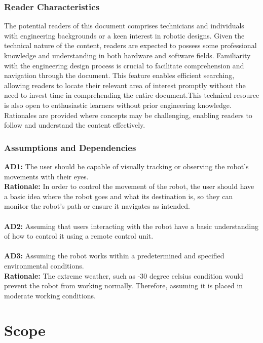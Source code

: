 \documentclass[12pt]{article}
\begin{document}
\subsubsection{Reader Characteristics}
The potential readers of this document comprises technicians and individuals with engineering backgrounds or a keen interest in robotic designs.
Given the technical nature of the content, readers are expected to possess some professional knowledge and understanding in both hardware and software fields. Familiarity with the engineering design process is crucial to facilitate comprehension and navigation through the document. This feature enables efficient searching, allowing readers to locate their relevant area of interest promptly without the need to invest time in comprehending the entire document.This technical resource is also open to enthusiastic learners without prior engineering knowledge. Rationales are provided where concepts may be challenging, enabling readers to follow and understand the content effectively.

\subsubsection{Assumptions and Dependencies}
\label{sec:Assumptions and Dependencies}
\textbf{AD1:} The user should be capable of visually tracking or observing the robot's movements with their eyes. \\
\textbf{Rationale:} In order to control the movement of the robot, the user should have a basic idea where the robot goes and what its destination is, so they can monitor the robot's path or ensure it navigates as intended.\\\\
\textbf{AD2:} Assuming that users interacting with the robot have a basic understanding of how to control it using a remote control unit. \\\\
\textbf{AD3:} Assuming the robot works within a predetermined and specified environmental conditions.\\
\textbf{Rationale:} The extreme weather, such as -30 degree celsius condition would prevent the robot from working normally. Therefore, assuming it is placed in moderate working conditions.


\section{Scope}
\end{document}
